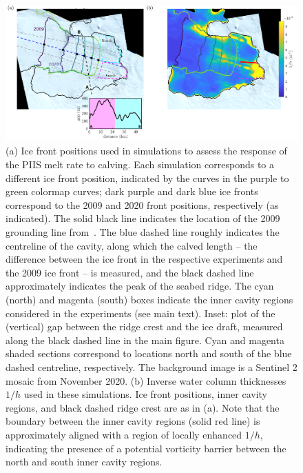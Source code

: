 \documentclass[draft]{agujournal2019}
\begin{document}
\begin{figure}
    \centering
    \includegraphics[width =\textwidth]{../make_figures/plots/figure10.pdf}
    \caption{(a) Ice front positions used in simulations to assess the response of the PIIS melt rate to calving. Each simulation corresponds to a different ice front position, indicated by the curves in the purple to green colormap curves; dark purple and dark blue ice fronts correspond to the 2009 and 2020 front positions, respectively (as indicated). The solid black line indicates the location of the 2009 grounding line from~. The blue dashed line roughly indicates the centreline of the cavity, along which the calved length -- the difference between the ice front in the respective experiments and the 2009 ice front -- is measured, and the black dashed line approximately indicates the peak of the seabed ridge. The cyan (north) and magenta (south) boxes indicate the inner cavity regions considered in the experiments (see main text). Inset: plot of the (vertical) gap between the ridge crest and the ice draft, measured along the black dashed line in the main figure. Cyan and magenta shaded sections correspond to locations north and south of the blue dashed centreline, respectively. The background image is a Sentinel 2 mosaic from November 2020. (b) Inverse water column thicknesses $1/h$ used in these simulations. Ice front positions, inner cavity regions, and black dashed ridge crest are as in (a).  Note that the boundary between the inner cavity regions (solid red line) is approximately aligned with a region of locally enhanced $1/h$, indicating the presence of a potential vorticity barrier between the north and south inner cavity regions.}
    \label{fig:figure10}
\end{figure}

\end{document}
